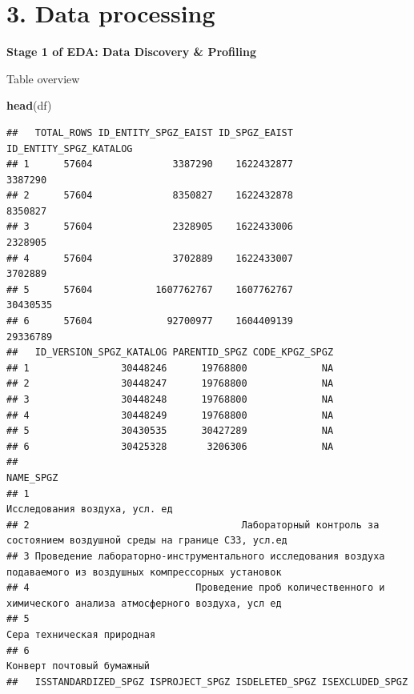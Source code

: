 \documentclass[
]{article}
\newenvironment{Shaded}{\begin{snugshade}}{\end{snugshade}}
\newcommand{\FunctionTok}[1]{\textcolor[rgb]{0.13,0.29,0.53}{\textbf{#1}}}
\newcommand{\NormalTok}[1]{#1}
\begin{document}
\newpage

\section{\texorpdfstring{\textbf{3. Data
processing}}{3. Data processing}}\label{data-processing}

\textbf{Stage 1 of EDA: Data Discovery \& Profiling}

Table overview

\begin{Shaded}
\begin{Highlighting}[]
\FunctionTok{head}\NormalTok{(df)}
\end{Highlighting}
\end{Shaded}

\begin{verbatim}
##   TOTAL_ROWS ID_ENTITY_SPGZ_EAIST ID_SPGZ_EAIST ID_ENTITY_SPGZ_KATALOG
## 1      57604              3387290    1622432877                3387290
## 2      57604              8350827    1622432878                8350827
## 3      57604              2328905    1622433006                2328905
## 4      57604              3702889    1622433007                3702889
## 5      57604           1607762767    1607762767               30430535
## 6      57604             92700977    1604409139               29336789
##   ID_VERSION_SPGZ_KATALOG PARENTID_SPGZ CODE_KPGZ_SPGZ
## 1                30448246      19768800             NA
## 2                30448247      19768800             NA
## 3                30448248      19768800             NA
## 4                30448249      19768800             NA
## 5                30430535      30427289             NA
## 6                30425328       3206306             NA
##                                                                                                        NAME_SPGZ
## 1                                                                                  Исследования воздуха, усл. ед
## 2                                     Лабораторный контроль за состоянием воздушной среды на границе СЗЗ, усл.ед
## 3 Проведение лабораторно-инструментального исследования воздуха подаваемого из воздушных компрессорных установок
## 4                             Проведение проб количественного и химического анализа атмосферного воздуха, усл ед
## 5                                                                                     Сера техническая природная
## 6                                                                                      Конверт почтовый бумажный
##   ISSTANDARDIZED_SPGZ ISPROJECT_SPGZ ISDELETED_SPGZ ISEXCLUDED_SPGZ

\end{verbatim}
\end{document}
